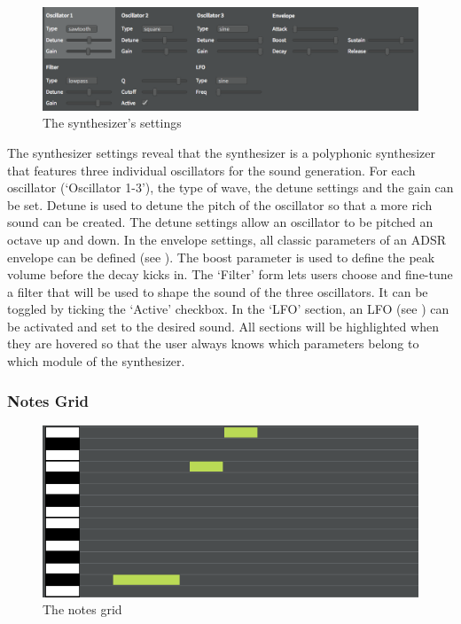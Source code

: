 \begin{figure}[htb]
  \centerline{\includegraphics[width=\linewidth]{images/synth-settings.png}}
  \caption[The synthesizer's settings]{The synthesizer's settings}
  \label{fig:editor-concept-synth-settings}
\end{figure}

The synthesizer settings reveal that the synthesizer is a polyphonic synthesizer that features three individual oscillators for the sound generation. For each oscillator (`Oscillator 1-3'), the type of wave, the detune settings and the gain can be set. Detune is used to detune the pitch of the oscillator so that a more rich sound can be created. The detune settings allow an oscillator to be pitched an octave up and down. In the envelope settings, all classic parameters of an ADSR envelope can be defined (see ). The boost parameter is used to define the peak volume before the decay kicks in. The `Filter' form lets users choose and fine-tune a filter that will be used to shape the sound of the three oscillators. It can be toggled by ticking the `Active' checkbox. In the `LFO' section, an LFO (see ) can be activated and set to the desired sound. All sections will be highlighted when they are hovered so that the user always knows which parameters belong to which module of the synthesizer.

\subsubsection{Notes Grid}
\label{concept-synth-grid}

\begin{figure}[htb]
  \centerline{\includegraphics[width=\linewidth]{images/notes-grid.png}}
  \caption[The notes grid]{The notes grid}
  \label{fig:editor-concept-notes-grid}
\end{figure}

